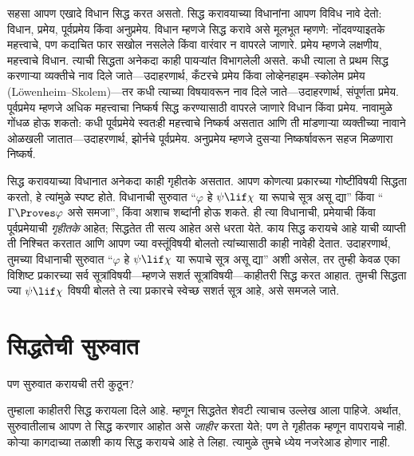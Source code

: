 सहसा आपण एखादे विधान सिद्ध करत असतो. सिद्ध करावयाच्या विधानांना आपण विविध नावे देतो: विधान, प्रमेय, पूर्वप्रमेय किंवा अनुप्रमेय. विधान म्हणजे सिद्ध करावे असे मूलभूत म्हणणे: नोंदवण्याइतके महत्त्वाचे, पण कदाचित फार सखोल नसलेले किंवा वारंवार न वापरले जाणारे. प्रमेय म्हणजे लक्षणीय, महत्त्वाचे विधान. त्याची सिद्धता अनेकदा काही पायऱ्यांत विभागलेली असते. कधी त्याला ते प्रथम सिद्ध करणाऱ्या व्यक्तीचे नाव दिले जाते---उदाहरणार्थ, कँटरचे प्रमेय किंवा लोव्हेनहाइम--स्कोलेम प्रमेय (L\"owenheim--Skolem)---तर कधी त्याच्या विषयावरून नाव दिले जाते---उदाहरणार्थ, संपूर्णता प्रमेय. पूर्वप्रमेय म्हणजे अधिक महत्त्वाचा निष्कर्ष सिद्ध करण्यासाठी वापरले जाणारे विधान किंवा प्रमेय. नावामुळे गोंधळ होऊ शकतो: कधी पूर्वप्रमेये स्वतःही महत्त्वाचे निष्कर्ष असतात आणि ती मांडणाऱ्या व्यक्तीच्या नावाने ओळखली जातात---उदाहरणार्थ, झोर्नचे पूर्वप्रमेय. अनुप्रमेय म्हणजे दुसऱ्या निष्कर्षावरून सहज मिळणारा निष्कर्ष.

सिद्ध करावयाच्या विधानात अनेकदा काही गृहीतके असतात. आपण कोणत्या प्रकारच्या गोष्टींविषयी सिद्धता करतो, हे त्यांमुळे स्पष्ट होते. विधानाची सुरुवात “$\varphi$ हे $\psi \lif \chi$ या रूपाचे सूत्र असू द्या” किंवा “$\Gamma \Proves \varphi$ असे समजा”, किंवा अशाच शब्दांनी होऊ शकते. ही त्या विधानाची, प्रमेयाची किंवा पूर्वप्रमेयाची \emph{गृहीतके} आहेत; सिद्धतेत ती सत्य आहेत असे धरता येते. काय सिद्ध करायचे आहे याची व्याप्ती ती निश्चित करतात आणि आपण ज्या वस्तूंविषयी बोलतो त्यांच्यासाठी काही नावेही देतात. उदाहरणार्थ, तुमच्या विधानाची सुरुवात “$\varphi$ हे $\psi \lif \chi$ या रूपाचे सूत्र असू द्या” अशी असेल, तर तुम्ही केवळ एका विशिष्ट प्रकारच्या सर्व सूत्रांविषयी---म्हणजे सशर्त सूत्रांविषयी---काहीतरी सिद्ध करत आहात. तुमची सिद्धता ज्या $\psi \lif \chi$ विषयी बोलते ते त्या प्रकारचे स्वेच्छ सशर्त सूत्र आहे, असे समजले जाते.












\section{सिद्धतेची सुरुवात}\label{mth:prf:str:sec}

पण सुरुवात करायची तरी कुठून?

तुम्हाला काहीतरी सिद्ध करायला दिले आहे. म्हणून सिद्धतेत शेवटी त्याचाच उल्लेख आला पाहिजे. अर्थात, सुरुवातीलाच आपण ते सिद्ध करणार आहोत असे \emph{जाहीर} करता येते; पण ते गृहीतक म्हणून वापरायचे नाही. कोऱ्या कागदाच्या तळाशी काय सिद्ध करायचे आहे ते लिहा. त्यामुळे तुमचे ध्येय नजरेआड होणार नाही.

